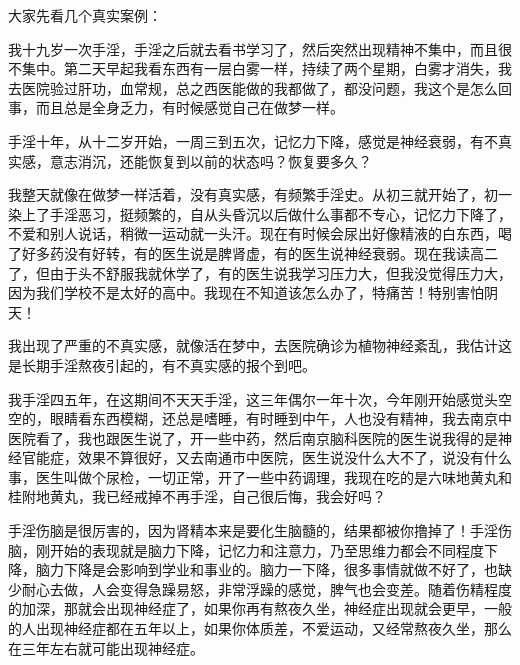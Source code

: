大家先看几个真实案例：

\begin{case}[不真实感]
    我十九岁一次手淫，手淫之后就去看书学习了，然后突然出现精神不集中，而且很不集中。第二天早起我看东西有一层白雾一样，持续了两个星期，白雾才消失，我去医院验过肝功，血常规，总之西医能做的我都做了，都没问题，我这个是怎么回事，而且总是全身乏力，有时候感觉自己在做梦一样。
\end{case}

\begin{case}[不真实感]
    手淫十年，从十二岁开始，一周三到五次，记忆力下降，感觉是神经衰弱，有不真实感，意志消沉，还能恢复到以前的状态吗？恢复要多久？
\end{case}

\begin{case}[不真实感]
    我整天就像在做梦一样活着，没有真实感，有频繁手淫史。从初三就开始了，初一染上了手淫恶习，挺频繁的，自从头昏沉以后做什么事都不专心，记忆力下降了，不爱和别人说话，稍微一运动就一头汗。现在有时候会尿出好像精液的白东西，喝了好多药没有好转，有的医生说是脾肾虚，有的医生说神经衰弱。现在我读高二了，但由于头不舒服我就休学了，有的医生说我学习压力大，但我没觉得压力大，因为我们学校不是太好的高中。我现在不知道该怎么办了，特痛苦！特别害怕阴天！
\end{case}

\begin{case}[不真实感]
    我出现了严重的不真实感，就像活在梦中，去医院确诊为植物神经紊乱，我估计这是长期手淫熬夜引起的，有不真实感的报个到吧。
\end{case}

\begin{case}[不真实感]
    我手淫四五年，在这期间不天天手淫，这三年偶尔一年十次，今年刚开始感觉头空空的，眼睛看东西模糊，还总是嗜睡，有时睡到中午，人也没有精神，我去南京中医院看了，我也跟医生说了，开一些中药，然后南京脑科医院的医生说我得的是神经官能症，效果不算很好，又去南通市中医院，医生说没什么大不了，说没有什么事，医生叫做个尿检，一切正常，开了一些中药调理，我现在吃的是六味地黄丸和桂附地黄丸，我已经戒掉不再手淫，自己很后悔，我会好吗？
\end{case}

手淫伤脑是很厉害的，因为肾精本来是要化生脑髓的，结果都被你撸掉了！手淫伤脑，刚开始的表现就是脑力下降，记忆力和注意力，乃至思维力都会不同程度下降，脑力下降是会影响到学业和事业的。脑力一下降，很多事情就做不好了，也缺少耐心去做，人会变得急躁易怒，非常浮躁的感觉，脾气也会变差。随着伤精程度的加深，那就会出现神经症了，如果你再有熬夜久坐，神经症出现就会更早，一般的人出现神经症都在五年以上，如果你体质差，不爱运动，又经常熬夜久坐，那么在三年左右就可能出现神经症。

